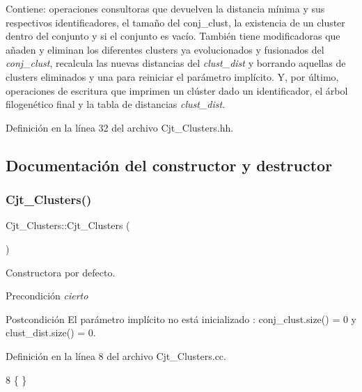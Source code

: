 Contiene\+: operaciones consultoras que devuelven la distancia mínima y sus respectivos identificadores, el tamaño del conj\+\_\+clust, la existencia de un cluster dentro del conjunto y si el conjunto es vacío. También tiene modificadoras que añaden y eliminan los diferentes clusters ya evolucionados y fusionados del {\itshape conj\+\_\+clust}, recalcula las nuevas distancias del {\itshape clust\+\_\+dist} y borrando aquellas de clusters eliminados y una para reiniciar el parámetro implícito. Y, por último, operaciones de escritura que imprimen un clúster dado un identificador, el árbol filogenético final y la tabla de distancias {\itshape clust\+\_\+dist}. 

Definición en la línea 32 del archivo Cjt\+\_\+\+Clusters.\+hh.



\subsection{Documentación del constructor y destructor}
\mbox{\label{class_cjt___clusters_a2e55759944a78043744103e19dd87c1c}} 
\subsubsection{\texorpdfstring{Cjt\+\_\+\+Clusters()}{Cjt\_Clusters()}}
{\footnotesize\ttfamily Cjt\+\_\+\+Clusters\+::\+Cjt\+\_\+\+Clusters (\begin{DoxyParamCaption}{ }\end{DoxyParamCaption})}



Constructora por defecto. 

\begin{DoxyPrecond}{Precondición}
{\itshape cierto} 
\end{DoxyPrecond}
\begin{DoxyPostcond}{Postcondición}
El parámetro implícito no está inicializado \+: conj\+\_\+clust.\+size() = 0 y clust\+\_\+dist.\+size() = 0. 
\end{DoxyPostcond}


Definición en la línea 8 del archivo Cjt\+\_\+\+Clusters.\+cc.


\begin{DoxyCode}
8 \{ \}
\end{DoxyCode}


